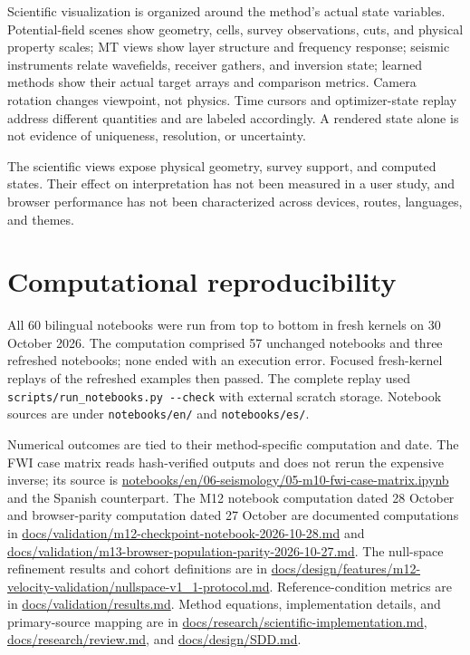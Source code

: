 Scientific visualization is organized around the method's actual state
variables. Potential-field scenes show geometry, cells, survey
observations, cuts, and physical property scales; MT views show layer
structure and frequency response; seismic instruments relate wavefields,
receiver gathers, and inversion state; learned methods show their actual
target arrays and comparison metrics. Camera rotation changes viewpoint,
not physics. Time cursors and optimizer-state replay address different
quantities and are labeled accordingly. A rendered state alone is not
evidence of uniqueness, resolution, or uncertainty.

The scientific views expose physical geometry, survey support, and
computed states. Their effect on interpretation has not been measured in
a user study, and browser performance has not been characterized across
devices, routes, languages, and themes.

\section{Computational
reproducibility}\label{computational-reproducibility}

All 60 bilingual notebooks were run from top to bottom in fresh kernels
on 30 October 2026. The computation comprised 57 unchanged notebooks and
three refreshed notebooks; none ended with an execution error. Focused
fresh-kernel replays of the refreshed examples then passed. The complete
replay used \texttt{scripts/run\_notebooks.py\ -\/-check} with external
scratch storage. Notebook sources are under \texttt{notebooks/en/} and
\texttt{notebooks/es/}.

Numerical outcomes are tied to their method-specific computation and
date. The FWI case matrix reads hash-verified outputs and does not rerun
the expensive inverse; its source is
\url{notebooks/en/06-seismology/05-m10-fwi-case-matrix.ipynb} and the
Spanish counterpart. The M12 notebook computation dated 28 October and
browser-parity computation dated 27 October are documented computations
in \url{docs/validation/m12-checkpoint-notebook-2026-10-28.md} and
\url{docs/validation/m13-browser-population-parity-2026-10-27.md}. The
null-space refinement results and cohort definitions are in
\url{docs/design/features/m12-velocity-validation/nullspace-v1_1-protocol.md}.
Reference-condition metrics are in \url{docs/validation/results.md}.
Method equations, implementation details, and primary-source mapping are
in \url{docs/research/scientific-implementation.md},
\url{docs/research/review.md}, and \url{docs/design/SDD.md}.

